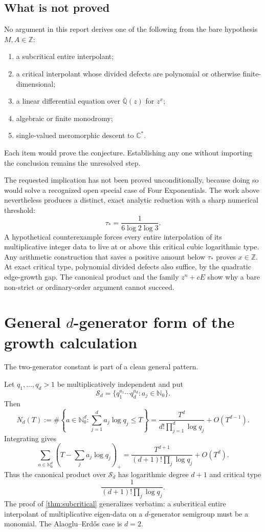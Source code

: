 \documentclass[11pt,oneside]{article}
\theoremstyle{definition}
\theoremstyle{remark}
\newcommand{\Nzero}{\mathbb N_0}
\newcommand{\Z}{\mathbb Z}
\newcommand{\C}{\mathbb C}
\newcommand{\Qbar}{\overline{\mathbb Q}}
\newcommand{\AEconj}{Alaoglu--Erd\H{o}s}
\begin{document}
\subsection{What is not proved}

No argument in this report derives one of the following from the bare hypothesis \(M,A\in\Z\):
\begin{enumerate}
\item a subcritical entire interpolant;
\item a critical interpolant whose divided defects are polynomial or otherwise finite-dimensional;
\item a linear differential equation over \(\Qbar(z)\) for \(z^x\);
\item algebraic or finite monodromy;
\item single-valued meromorphic descent to \(\C^*\).
\end{enumerate}
Each item would prove the conjecture.  Establishing any one without importing the conclusion remains the unresolved step.

\begin{verdictbox}
The requested implication has not been proved unconditionally, because doing so would solve a recognized open special case of Four Exponentials.  The work above nevertheless produces a distinct, exact analytic reduction with a sharp numerical threshold:
\[
\boxed{\displaystyle
\tau_* = \frac1{6\log2\log3}.}
\]
A hypothetical counterexample forces every entire interpolation of its multiplicative integer data to live at or above this critical cubic logarithmic type.  Any arithmetic construction that saves a positive amount below \(\tau_*\) proves \(x\in\Z\).  At exact critical type, polynomial divided defects also suffice, by the quadratic edge-growth gap.  The canonical product and the family \(z^n+cE\) show why a bare non-strict or ordinary-order argument cannot succeed.
\end{verdictbox}

\appendix

\section{General \texorpdfstring{\(d\)}{d}-generator form of the growth calculation}

The two-generator constant is part of a clean general pattern.

Let \(q_1,\dots,q_d>1\) be multiplicatively independent and put
\[
  \mathcal S_d=\{q_1^{a_1}\cdots q_d^{a_d}:a_j\in\Nzero\}.
\]
Then
\[
  N_d(T):=\#\left\{a\in\Nzero^d:
  \sum_{j=1}^d a_j\log q_j\le T\right\}
  =\frac{T^d}{d!\prod_{j=1}^d\log q_j}+O(T^{d-1}).
\]
Integrating gives
\[
  \sum_{a\in\Nzero^d}
  \left(T-\sum_j a_j\log q_j\right)_+
  =\frac{T^{d+1}}{(d+1)!\prod_j\log q_j}+O(T^d).
\]
Thus the canonical product over \(\mathcal S_d\) has logarithmic degree \(d+1\) and critical type
\[
  \frac1{(d+1)!\prod_j\log q_j}.
\]
The proof of \cref{thm:subcritical} generalizes verbatim: a subcritical entire interpolant of multiplicative eigen-data on a \(d\)-generator semigroup must be a monomial.  The \AEconj{} case is \(d=2\).
\end{document}
